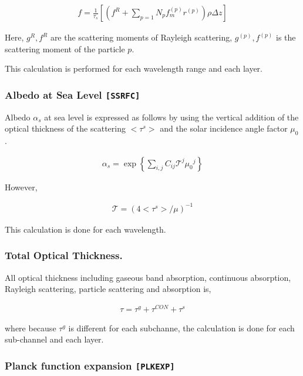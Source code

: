 \begin{eqnarray}
f = \frac{1}{\tau_s} \left[ 
    \left( f^R + \sum_{p=1}{N_p} f^{(p)}_m r^{(p)}\right) \rho \Delta z
    \right]
\end{eqnarray}

Here, \(g^R, f^R\) are the scattering moments of Rayleigh scattering,
\(g^{(p)}, f^{(p)}\) is the scattering moment of the particle \(p\).

This calculation is performed for each wavelength range and each layer.

\hypertarget{albedo-at-sea-level-ssrfc}{%
\subsubsection{\texorpdfstring{Albedo at Sea Level
\texttt{{[}SSRFC{]}}}{Albedo at Sea Level {[}SSRFC{]}}}\label{albedo-at-sea-level-modulessrfc}}

Albedo \(\alpha_s\) at sea level is expressed as follows by using the vertical addition of the optical
thickness of the scattering \(<\tau^{s}>\) and the solar incidence
angle factor \(\mu_0\).

\begin{eqnarray}
  \alpha_s = \exp\left\{ \sum_{i,j} C_{ij} {\mathcal T}^j {\mu_0}^j \right\}
\end{eqnarray}

However,

\begin{eqnarray}
 {\mathcal T} = ( 4 <\tau^{s}>/\mu )^{-1}
\end{eqnarray}

This calculation is done for each wavelength.

\hypertarget{total-optical-thickness}{%
\subsubsection{Total Optical
Thickness.}\label{total-optical-thickness.}}

All optical thickness including gaseous band absorption, continuous absorption, Rayleigh scattering,
particle scattering and absorption is,

\begin{eqnarray}
  \tau = \tau^g + \tau^{CON} + \tau^{s}
\end{eqnarray}

where because \(\tau^g\) is different for each subchanne, the calculation is done for
each sub-channel and each layer.

\hypertarget{planck-function-expansion-plkexp}{%
\subsubsection{\texorpdfstring{Planck function expansion
\texttt{{[}PLKEXP{]}}}{Planck function expansion {[}PLKEXP{]}}}\label{planck-function-expansion-moduleplkexp}}

